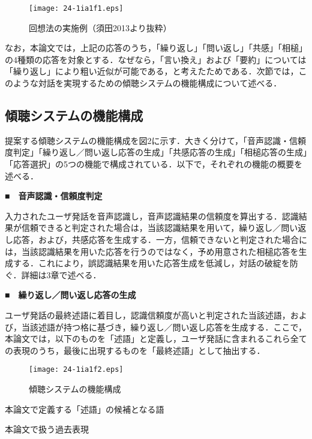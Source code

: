\documentclass[japanese]{jnlp_1.4}
\begin{document}
\begin{figure}[t]
\begin{center}
\texttt{[image: 24-1ia1f1.eps]}
\end{center}
\caption{回想法の実施例（須田2013より抜粋）}
\label{fig:1}
\end{figure}

なお，本論文では，上記の応答のうち，「繰り返し」「問い返し」「共感」「相槌」の4種類の応答を対象とする．なぜなら，「言い換え」および「要約」については「繰り返し」により粗い近似が可能である，と考えたためである．次節では，このような対話を実現するための傾聴システムの機能構成について述べる．

\subsection{傾聴システムの機能構成}

提案する傾聴システムの機能構成を図2に示す．大きく分けて，「音声認識・信頼度判定」「繰り返し／問い返し応答の生成」「共感応答の生成」「相槌応答の生成」「応答選択」の5つの機能で構成されている．以下で，それぞれの機能の概要を述べる．


\noindent\textbf{■　音声認識・信頼度判定}

入力されたユーザ発話を音声認識し，音声認識結果の信頼度を算出する．認識結果が信頼できると判定された場合は，当該認識結果を用いて，繰り返し／問い返し応答，および，共感応答を生成する．一方，信頼できないと判定された場合には，当該認識結果を用いた応答を行うのではなく，予め用意された相槌応答を生成する．これにより，誤認識結果を用いた応答生成を低減し，対話の破綻を防ぐ．詳細は3章で述べる．

\clearpage
\noindent\textbf{■　繰り返し／問い返し応答の生成}

ユーザ発話の最終述語に着目し，認識信頼度が高いと判定された当該述語，および，当該述語が持つ格に基づき，繰り返し／問い返し応答を生成する．ここで，本論文では，以下のものを「述語」と定義し，ユーザ発話に含まれるこれら全ての表現のうち，最後に出現するものを「最終述語」として抽出する．

\begin{figure}[b]
\vspace{-1\Cvs}
\begin{center}
\texttt{[image: 24-1ia1f2.eps]}
\end{center}
\caption{傾聴システムの機能構成}
\label{fig:2}
\vspace{1\Cvs}
\end{figure}
\begin{table}[b]
\caption{本論文で定義する「述語」の候補となる語}
\label{table:2}

\end{table}
\begin{table}[b]
\caption{本論文で扱う過去表現}
\label{table:3}

\end{table}
\end{document}
